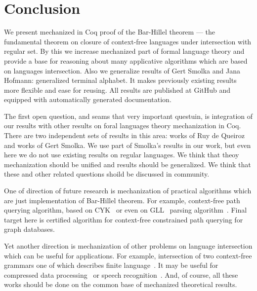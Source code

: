 \section{Conclusion}

We present mechanized in Coq proof of the Bar-Hillel theorem --- the fundamental theorem on closure of context-free languages under intersection with regular set.
By this we increase mechanized part of formal language theory and provide a base for reasoning about many applicative algorithms which are based on languages intersection.
Also we generalize results of Gert Smolka and Jana Hofmann: generalized terminal alphabet. 
It makes previously existing results more flexible and ease for reusing.
All results are published at GitHub and equipped with automatically generated documentation.

The first open question, and seams that very important questuin, is integration of our results with other results on foral languages theory mechanization in Coq. 
There are two independent sets of results in this area: works of Ruy de Queiroz and works of Gert Smolka.
We use part of Smolka's results in our work, but even here we do not use existing results on regular languages.
We think that theoy mechanization should be unified and results should be generalized.
We think that these and other related questions shoild be discussed in community.

One of direction of future research is mechanization of practical algorithms which are just implementation of Bar-Hillel theorem.
For example, context-free path querying algorithm, based on CYK~\cite{hellingsPathQuerying,zhang2016context} or even on GLL~\cite{scott2010gll} parsing algorithm~\cite{grigorev2016context}.
Final target here is certified algorithm for context-free constrained path querying for graph databases.

Yet another direction is mechanization of other problems on language intersection which can be useful for applications.
For example, intersection of two context-free grammars one of which describes finite language~\cite{nederhof2002parsing, nederhof2004language}.
It may be useful for compressed data processing~\cite{!!!} or speech recognition~\cite{!!!}.
And, of course, all these works should be done on the common base of mechanized theoretical results.



